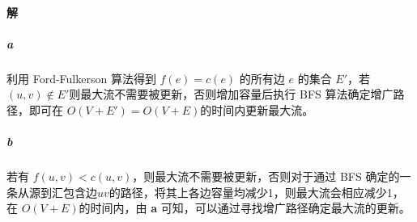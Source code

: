 \documentclass{article}
\begin{document}
\paragraph{解}
\subparagraph{a}
利用 Ford-Fulkerson 算法得到 $f(e) = c(e)$ 的所有边 $e$ 的集合 $E'$，若$(u, v) \notin E'$则最大流不需要被更新，否则增加容量后执行 BFS 算法确定增广路径，即可在 $O(V + E') = O(V + E)$的时间内更新最大流。
\subparagraph{b}
若有 $f(u,v) < c(u,v)$，则最大流不需要被更新，否则对于通过 BFS 确定的一条从源到汇包含边$uv$的路径，将其上各边容量均减少1，则最大流会相应减少1，在 $O(V + E)$的时间内，由 \textbf{a} 可知，可以通过寻找增广路径确定最大流的更新。
\end{document}
